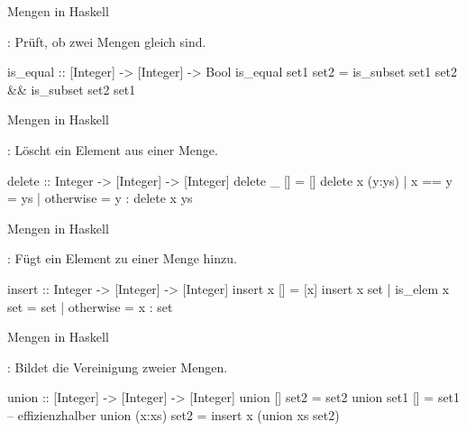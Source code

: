 \resetframecounters
\begin{frame}[fragile]{Mengen in Haskell}
    \begin{exercise}[d)]
        : Prüft, ob zwei Mengen gleich sind.
        \end{exercise}
        \begin{solve}[d)]
        \begin{plainhaskell}
is_equal :: [Integer] -> [Integer] -> Bool
is_equal set1 set2 = is_subset set1 set2 && is_subset set2 set1
        \end{plainhaskell}
        \end{solve}
\end{frame}
\resetframecounters
\begin{frame}[fragile]{Mengen in Haskell}
    \begin{exercise}[e)]
        : Löscht ein Element aus einer Menge.
        \end{exercise}
        \begin{solve}[e)]
        \begin{plainhaskell}
delete :: Integer -> [Integer] -> [Integer]
delete _ [] = []
delete x (y:ys)
    | x == y = ys
    | otherwise = y : delete x ys
        \end{plainhaskell}
        \end{solve}
\end{frame}
\resetframecounters
\begin{frame}[fragile]{Mengen in Haskell}
    \begin{exercise}[f)]
        : Fügt ein Element zu einer Menge hinzu.
        \end{exercise}
        \begin{solve}[f)]
        \begin{plainhaskell}
insert :: Integer -> [Integer] -> [Integer]
insert x [] = [x]
insert x set
    | is_elem x set = set
    | otherwise = x : set
        \end{plainhaskell}
        \end{solve}
\end{frame}
\resetframecounters
\begin{frame}[fragile]{Mengen in Haskell}
    \begin{exercise}[g)]
        : Bildet die Vereinigung zweier Mengen.
        \end{exercise}
        \begin{solve}[g)]
        \begin{plainhaskell}
union :: [Integer] -> [Integer] -> [Integer]
union [] set2 = set2
union set1 [] = set1 -- effizienzhalber
union (x:xs) set2 = insert x (union xs set2)
        \end{plainhaskell}
        \end{solve}
\end{frame}